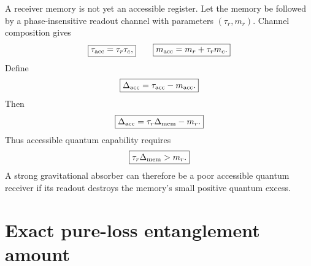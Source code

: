 A receiver memory is not yet an accessible register. Let the memory be followed by a phase-insensitive readout channel with parameters $(\tau_r,m_r)$. Channel composition gives
\begin{equation}
\boxed{\tau_{\rm acc}=\tau_r\tau_c,}
\qquad
\boxed{m_{\rm acc}=m_r+\tau_r m_c.}
\label{eq:readoutcompose}
\end{equation}
Define
\begin{equation}
\boxed{\Delta_{\rm acc}=\tau_{\rm acc}-m_{\rm acc}.}
\end{equation}
Then
\begin{equation}
\boxed{
\Delta_{\rm acc}=\tau_r\Delta_{\rm mem}-m_r.}
\label{eq:Dacc}
\end{equation}
Thus accessible quantum capability requires
\begin{equation}
\boxed{\tau_r\Delta_{\rm mem}>m_r.}
\label{eq:accesscond}
\end{equation}
A strong gravitational absorber can therefore be a poor accessible quantum receiver if its readout destroys the memory's small positive quantum excess.

\section{Exact pure-loss entanglement amount}
\label{sec:negativity}

